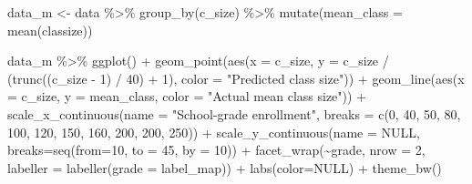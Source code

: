 \documentclass[
  letterpaper,
  DIV=11,
  numbers=noendperiod]{scrartcl}
\newenvironment{Shaded}{\begin{snugshade}}{\end{snugshade}}
\newcommand{\AttributeTok}[1]{\textcolor[rgb]{0.40,0.45,0.13}{#1}}
\newcommand{\ConstantTok}[1]{\textcolor[rgb]{0.56,0.35,0.01}{#1}}
\newcommand{\DecValTok}[1]{\textcolor[rgb]{0.68,0.00,0.00}{#1}}
\newcommand{\FunctionTok}[1]{\textcolor[rgb]{0.28,0.35,0.67}{#1}}
\newcommand{\NormalTok}[1]{\textcolor[rgb]{0.00,0.23,0.31}{#1}}
\newcommand{\OtherTok}[1]{\textcolor[rgb]{0.00,0.23,0.31}{#1}}
\newcommand{\SpecialCharTok}[1]{\textcolor[rgb]{0.37,0.37,0.37}{#1}}
\newcommand{\StringTok}[1]{\textcolor[rgb]{0.13,0.47,0.30}{#1}}
\begin{document}
\begin{Shaded}
\begin{Highlighting}[]
\NormalTok{data\_m }\OtherTok{\textless{}{-}}\NormalTok{ data }\SpecialCharTok{\%\textgreater{}\%} 
  \FunctionTok{group\_by}\NormalTok{(c\_size) }\SpecialCharTok{\%\textgreater{}\%} 
  \FunctionTok{mutate}\NormalTok{(}\AttributeTok{mean\_class =} \FunctionTok{mean}\NormalTok{(classize))}

\NormalTok{data\_m }\SpecialCharTok{\%\textgreater{}\%}  
  \FunctionTok{ggplot}\NormalTok{() }\SpecialCharTok{+}
  \FunctionTok{geom\_point}\NormalTok{(}\FunctionTok{aes}\NormalTok{(}\AttributeTok{x =}\NormalTok{ c\_size, }\AttributeTok{y =}\NormalTok{ c\_size }\SpecialCharTok{/}\NormalTok{ (}\FunctionTok{trunc}\NormalTok{((c\_size }\SpecialCharTok{{-}} \DecValTok{1}\NormalTok{) }\SpecialCharTok{/} \DecValTok{40}\NormalTok{) }\SpecialCharTok{+} \DecValTok{1}\NormalTok{), }\AttributeTok{color =} \StringTok{"Predicted class size"}\NormalTok{)) }\SpecialCharTok{+}
  \FunctionTok{geom\_line}\NormalTok{(}\FunctionTok{aes}\NormalTok{(}\AttributeTok{x =}\NormalTok{ c\_size, }\AttributeTok{y =}\NormalTok{ mean\_class, }\AttributeTok{color =} \StringTok{"Actual mean class size"}\NormalTok{)) }\SpecialCharTok{+} 
  \FunctionTok{scale\_x\_continuous}\NormalTok{(}\AttributeTok{name =} \StringTok{"School{-}grade enrollment"}\NormalTok{, }\AttributeTok{breaks =} \FunctionTok{c}\NormalTok{(}\DecValTok{0}\NormalTok{, }\DecValTok{40}\NormalTok{, }\DecValTok{50}\NormalTok{, }\DecValTok{80}\NormalTok{, }\DecValTok{100}\NormalTok{, }\DecValTok{120}\NormalTok{, }\DecValTok{150}\NormalTok{, }\DecValTok{160}\NormalTok{, }\DecValTok{200}\NormalTok{, }\DecValTok{200}\NormalTok{, }\DecValTok{250}\NormalTok{)) }\SpecialCharTok{+}
  \FunctionTok{scale\_y\_continuous}\NormalTok{(}\AttributeTok{name =} \ConstantTok{NULL}\NormalTok{, }\AttributeTok{breaks=}\FunctionTok{seq}\NormalTok{(}\AttributeTok{from=}\DecValTok{10}\NormalTok{, }\AttributeTok{to =} \DecValTok{45}\NormalTok{, }\AttributeTok{by =} \DecValTok{10}\NormalTok{)) }\SpecialCharTok{+}
  \FunctionTok{facet\_wrap}\NormalTok{(}\SpecialCharTok{\textasciitilde{}}\NormalTok{grade, }\AttributeTok{nrow =} \DecValTok{2}\NormalTok{, }\AttributeTok{labeller =} \FunctionTok{labeller}\NormalTok{(}\AttributeTok{grade =}\NormalTok{ label\_map)) }\SpecialCharTok{+}
  \FunctionTok{labs}\NormalTok{(}\AttributeTok{color=}\ConstantTok{NULL}\NormalTok{) }\SpecialCharTok{+} 
  \FunctionTok{theme\_bw}\NormalTok{()}
\end{Highlighting}
\end{Shaded}
\end{document}
